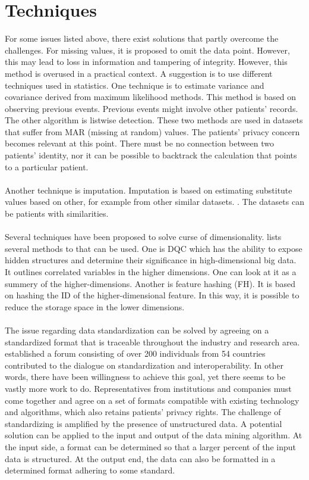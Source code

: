 \section{Techniques}
For some issues listed above, there exist solutions that partly overcome the challenges. For missing values, it is proposed to omit the data point. However, this may lead to loss in information and tampering of integrity. However, this method is overused in a practical context. \cite{wp} A suggestion is to use different techniques used in statistics. One technique is to estimate variance and covariance derived from maximum likelihood methods. This method is based on observing previous events. Previous events might involve other patients' records. The other algorithm is listwise detection. These two methods are used in datasets that suffer from MAR (missing at random) values. \cite{statistics} The patients' privacy concern becomes relevant at this point. There must be no connection between two patients' identity, nor it can be possible to backtrack the calculation that points to a particular patient. 
\\\\
Another technique is imputation. Imputation is based on estimating substitute values based on other, for example from other similar datasets. \cite{imputation}. The datasets can be patients with similarities. 
\\\\
Several techniques have been proposed to solve curse of dimensionality. \cite{cod} lists several methods to that can be used. One is DQC which has the ability to expose hidden structures and determine their significance in high-dimensional big data. It outlines correlated variables in the higher dimensions. One can look at it as a summery of the higher-dimensions. Another is feature hashing (FH). It is based on hashing the ID of the higher-dimensional feature. In this way, it is possible to reduce the storage space in the lower dimensions. 
\\\\
The issue regarding data standardization can be solved by agreeing on a standardized format that is traceable throughout the industry and research area. \cite{who} established a forum consisting of over 200 individuals from 54 countries contributed to the dialogue on standardization and interoperability. In other words, there have been willingness to achieve this goal, yet there seems to be vastly more work to do.  Representatives from institutions and companies must come together and agree on a set of formats compatible with existing technology and algorithms, which also retains patients’ privacy rights. The challenge of standardizing is amplified by the presence of unstructured data. A potential solution can be applied to the input and output of the data mining algorithm. At the input side, a format can be determined so that a larger percent of the input data is structured. At the output end, the data can also be formatted in a determined format adhering to some standard.
